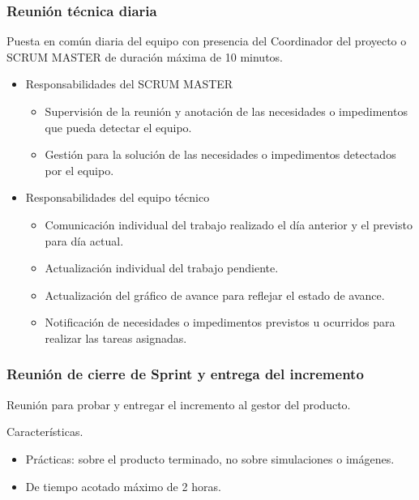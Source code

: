 \subsubsection{Reunión técnica diaria}

\hspace*{2em}Puesta en común diaria del equipo con presencia del Coordinador del proyecto o SCRUM MASTER de duración máxima de 10 minutos.

	\begin{itemize}
		\item Responsabilidades del SCRUM MASTER
		\begin{itemize}
			\item Supervisión de la reunión y anotación de las necesidades o impedimentos que pueda detectar el equipo.
			\item Gestión para la solución de las necesidades o impedimentos detectados por el equipo.
		\end{itemize}
		\item Responsabilidades del equipo técnico
		\begin{itemize}
			\item Comunicación individual del trabajo realizado el día anterior y el previsto para día actual.
			\item Actualización individual del trabajo pendiente.
			\item Actualización del gráfico de avance para reflejar el estado de avance.
			\item Notificación de necesidades o impedimentos previstos u ocurridos para realizar las tareas asignadas.
		\end{itemize}
	\end{itemize}

\subsubsection{Reunión de cierre de Sprint y entrega del incremento}

\hspace*{2em}Reunión para probar y entregar el incremento al gestor del producto.

Características.
	\begin{itemize}
		\item Prácticas: sobre el producto terminado, no sobre simulaciones o imágenes.
		\item De tiempo acotado máximo de 2 horas.
	\end{itemize}

